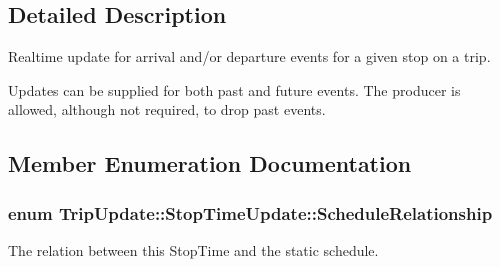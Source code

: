 \subsection{Detailed Description}
Realtime update for arrival and/or departure events for a given stop on a trip. 

Updates can be supplied for both past and future events. The producer is allowed, although not required, to drop past events. 

\subsection{Member Enumeration Documentation}
\subsubsection[{\texorpdfstring{Schedule\+Relationship}{ScheduleRelationship}}]{\setlength{\rightskip}{0pt plus 5cm}enum {\bf Trip\+Update\+::\+Stop\+Time\+Update\+::\+Schedule\+Relationship}}\hypertarget{structTripUpdate_1_1StopTimeUpdate_a624ef1349bfc24a44984c33761070726}{}\label{structTripUpdate_1_1StopTimeUpdate_a624ef1349bfc24a44984c33761070726}


The relation between this Stop\+Time and the static schedule. 


